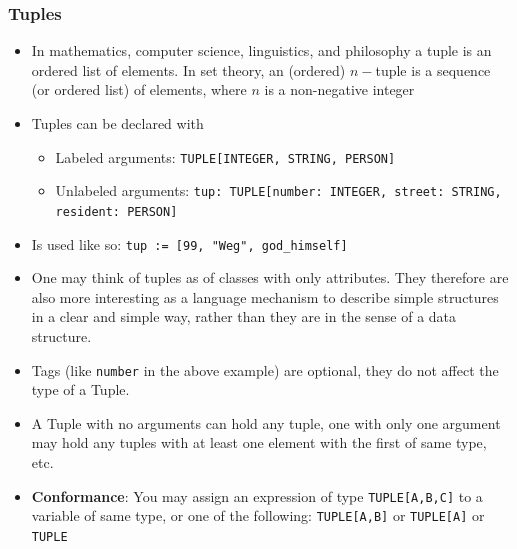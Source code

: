\documentclass[a4paper]{article}
\newcommand{\inline}[1]{\lstinline!#1!}%
\begin{document}
\subsubsection{Tuples}
\begin{itemize}
\item In mathematics, computer science, linguistics, and philosophy a tuple is an ordered list of elements. In set theory, an (ordered) $n-$tuple is a sequence (or ordered list) of elements, where $n$ is a non-negative integer
\item Tuples can be declared with
\begin{itemize}
\item Labeled arguments: \inline{TUPLE[INTEGER, STRING, PERSON]}
 \item Unlabeled arguments: \inline{tup: TUPLE[number: INTEGER, street: STRING, resident: PERSON]}
\end{itemize}
\item Is used like so:  \inline{tup := [99, "Weg", god_himself]}
\item One may think of tuples as of classes with only attributes. They therefore are also more interesting as a language mechanism to describe simple structures in a clear and simple way, rather than they are in the sense of a data structure.
\item Tags (like \inline{number} in the above example) are optional, they do not affect the type of a Tuple. 
\item A Tuple with no arguments can hold any tuple, one with only one argument may hold any tuples with at least one element with the first of same type, etc.
\item \textbf{Conformance}: You may assign an expression of type \inline{TUPLE[A,B,C]} to a variable of same type, or one of the following: \inline{TUPLE[A,B]} or \inline{TUPLE[A]} or \inline{TUPLE}
\end{itemize}
\end{document}
